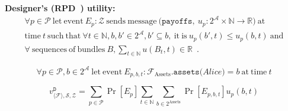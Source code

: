 \noindent \textbf{Designer's (RPD~\cite{rationalprotocol}) utility:}
\begin{gather*}
  \forall p \in \mathcal{P} \: \mathrm{let \: event} \: E_p: \mathcal{Z} \: \mathrm{sends
  \: message} \: \mathtt{(payoffs,} \: u_p:2^{\mathcal{A}} \times \mathbb{N} \rightarrow
  \mathbb{R} \mathtt{)} \: \mathrm{at} \\
  \mathrm{time} \: t \: \mathrm{such \: that} \: \forall t \in \mathbb{N}, b, b' \in
  2^{\mathcal{A}}, b' \subseteq b, \: \mathrm{it \: is} \: u_p\left(b', t\right) \leq
  u_p\left(b, t\right) \: \mathrm{and} \\
  \forall \: \mathrm{sequences \: of \: bundles} \: B, \sum\limits_{t \in
  \mathbb{N}}u\left(B_t, t\right) \in \mathbb{R}\enspace.
\end{gather*}

\begin{equation*}
  \forall p \in \mathcal{P}, b \in 2^{\mathcal{A}} \: \mathrm{let \: event} \: E_{p, b,
  t}: \mathcal{F}_{\mathrm{Assets}}.\mathtt{assets(}Alice\mathtt{)} = b \: \mathrm{at \:
  time} \: t
\end{equation*}

\begin{equation*}
  v^{\mathtt{D}}_{\langle \mathcal{F} \rangle, \mathcal{S}, \mathcal{Z}} = \sum\limits_{p
  \in \mathcal{P}} \Pr\left[E_p\right] \sum\limits_{t \in \mathbb{N}} \sum\limits_{b \in
  2^{\mathrm{Assets}}} \Pr\left[E_{p, b, t}\right] u_p\left(b, t\right)
\end{equation*}
